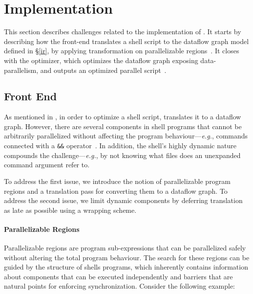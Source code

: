 \documentclass[letterpaper,twocolumn,10pt]{article}
\newcommand{\eg}{{\em e.g.}, }
\newcommand{\ttt}[1]{\texttt{\small #1}}
\newcommand{\kk}[1]{[{\color{magenta}#1 --- kk}]}
\begin{document}
\section{Implementation}
\label{impl}

This section describes challenges related to the implementation of
\sys. It starts by describing how the \sys front-end translates a
shell script to the dataflow graph model defined in \S\ref{ir}, by
applying transformation on parallelizable regions~.  It
closes with the \sys optimizer, which optimizes the dataflow graph
exposing data-parallelism, and outputs an optimized
parallel script~.

\subsection{Front End}
\label{front-end}

As mentioned in , in order to optimize a shell script, \sys
translates it to a dataflow graph.  However, there are several
components in shell programs that cannot be arbitrarily parallelized
without affecting the program behaviour---\eg commands connected with
a \ttt{\&\&} operator~. In addition, the shell's highly dynamic
nature compounds the challenge---\eg by not knowing what files does an
unexpanded command argument refer to.


To address the first issue, we introduce the notion of parallelizable
program regions and a translation pass for converting them to a
dataflow graph. To address the second issue, we limit dynamic
components by deferring translation as late as possible using a
wrapping scheme.


\paragraph{Parallelizable Regions}
%
%
Parallelizable regions are program sub-expressions that can be
parallelized safely without altering the total program behaviour.
The search for these regions can be guided by the structure of shells
programs, which inherently contains information about components that
can be executed independently and barriers that are natural points for
enforcing synchronization. Consider the following example:
\end{document}
